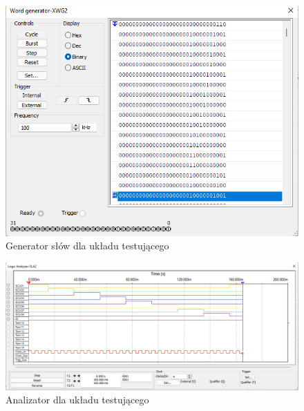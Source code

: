 \documentclass{article}
\begin{document}
\begin{figure}[H]
    \centering
    \includegraphics[width=\textwidth]{test_gen_2.png}
    \caption{Generator słów dla układu testującego}
\end{figure}

\begin{figure}[H]
    \centering
    \includegraphics[width=\textwidth]{test_an_2.png}
    \caption{Analizator dla układu testującego}
\end{figure}
\end{document}
